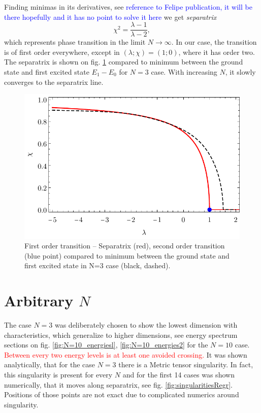 Finding minimas in its derivatives, see \textcolor{blue}{reference to Felipe publication, it will be there hopefully and it has no point to solve it here} we get \emph{separatrix}
\begin{equation}
    \chi^2=\frac{\lambda-1}{\lambda-2},
    \label{eq:separatrix}
\end{equation}
which represents phase transition in the limit $N\rightarrow \infty$. In our case, the transition is of first order everywhere, except in $(\lambda;\chi)=(1;0)$, where it has order two. The separatrix is shown on fig. \ref{fig:transitionCompare} compared to minimum between the ground state and first excited state $E_1-E_0$ for $N=3$ case. With increasing $N$, it slowly converges to the separatrix line.

\begin{figure}[h]
    \centering
    \includegraphics{../img/infiniteN_transitionCompare.pdf}
    \caption{First order transition -- Separatrix (red), second order transition (blue point) compared to minimum between the ground state and first excited state in N=3 case (black, dashed).}
    \label{fig:transitionCompare}    
\end{figure}

\section{Arbitrary $N$}
The case $N=3$ was deliberately chosen to show the lowest dimension with characteristics, which generalize to higher dimensions, see energy spectrum sections on fig. \ref{fig:N=10_energiesl}, \ref{fig:N=10_energies2} for the $N=10$ case. \textcolor{red}{Between every two energy levels is at least one avoided crossing.} It was shown analytically, that for the case $N=3$ there is a Metric tensor singularity. In fact, this singularity is present for every $N$ and for the first 14 cases was shown numerically, that it moves along separatrix, see fig. \ref{fig:singularitiesRegr}. Positions of those points are not exact due to complicated numerics around singularity.
 


